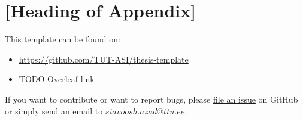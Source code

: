 \section{[Heading of Appendix]}
This template can be found on:
\begin{itemize}
\item \url{https://github.com/TUT-ASI/thesis-template}
\item TODO Overleaf link %
\end{itemize}


If you want to contribute or want to report bugs, please
\href{https://github.com/TUT-ASI/thesis-template/issues}{file an issue}
on GitHub or simply send an email to $siavoosh.azad@ttu.ee$.
